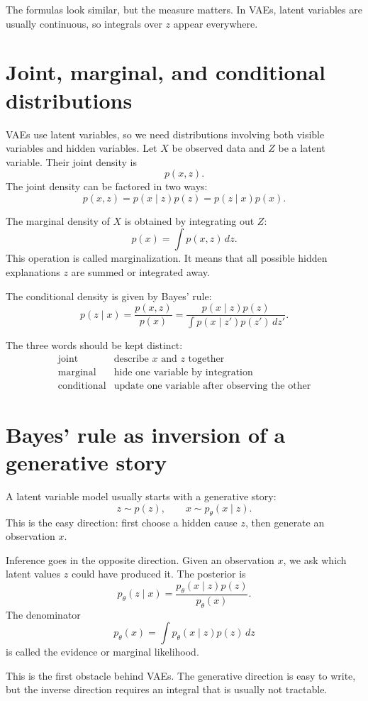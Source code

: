 The formulas look similar, but the measure matters.  In VAEs, latent variables are usually continuous, so integrals over \(z\) appear everywhere.

\section{Joint, marginal, and conditional distributions}

VAEs use latent variables, so we need distributions involving both visible variables and hidden variables.  Let \(X\) be observed data and \(Z\) be a latent variable.  Their joint density is
\[
  p(x,z).
\]
The joint density can be factored in two ways:
\[
  p(x,z)=p(x\mid z)p(z)=p(z\mid x)p(x).
\]

The marginal density of \(X\) is obtained by integrating out \(Z\):
\[
  p(x)=\int p(x,z)\,dz.
\]
This operation is called marginalization.  It means that all possible hidden explanations \(z\) are summed or integrated away.

The conditional density is given by Bayes' rule:
\[
  p(z\mid x)=\frac{p(x,z)}{p(x)}
  =\frac{p(x\mid z)p(z)}{\int p(x\mid z')p(z')\,dz'}.
\]

The three words should be kept distinct:
\[
\begin{array}{c|c}
\text{joint} & \text{describe }x\text{ and }z\text{ together}\\
\text{marginal} & \text{hide one variable by integration}\\
\text{conditional} & \text{update one variable after observing the other}
\end{array}
\]

\section{Bayes' rule as inversion of a generative story}

A latent variable model usually starts with a generative story:
\[
  z\sim p(z),\qquad x\sim p_\theta(x\mid z).
\]
This is the easy direction: first choose a hidden cause \(z\), then generate an observation \(x\).

Inference goes in the opposite direction.  Given an observation \(x\), we ask which latent values \(z\) could have produced it.  The posterior is
\[
  p_\theta(z\mid x)=\frac{p_\theta(x\mid z)p(z)}{p_\theta(x)}.
\]
The denominator
\[
  p_\theta(x)=\int p_\theta(x\mid z)p(z)\,dz
\]
is called the evidence or marginal likelihood.

This is the first obstacle behind VAEs.  The generative direction is easy to write, but the inverse direction requires an integral that is usually not tractable.

